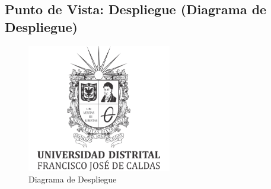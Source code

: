 \documentclass[12pt]{article}
\begin{document}
\subsection{Punto de Vista: Despliegue (Diagrama de Despliegue)}
\begin{figure}[H]
    \centering
    \includegraphics[width=\textwidth]{img/ud.png}
    \caption{Diagrama de Despliegue}
    \label{fig:diagrama_despliegue}
\end{figure}
\end{document}
